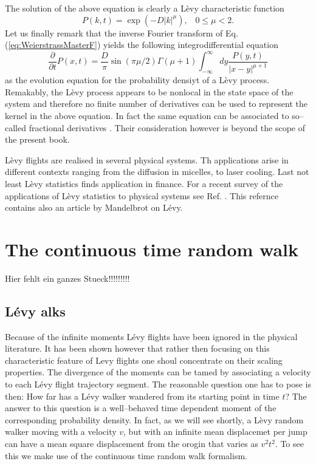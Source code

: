 The solution of the above equation is clearly a L\`evy characteristic function
\begin{displaymath}
  P(k,t) = \exp(-D |k|^{\mu}), \;\;\; 0 \le \mu <2.
\end{displaymath}
Let us finally remark that the inverse Fourier transform of Eq. 
(\ref{eq:WeierstrassMasterF}) yields the following integrodifferential
equation
\begin{displaymath}
 \frac{\partial}{\partial t} P(x,t) = \frac{D}{\pi} \sin(\pi \mu/2) 
         \Gamma(\mu +1) \int_{-\infty}^{\infty} dy
           \frac{P(y,t)}{|x-y|^{\mu +1}} 
\end{displaymath}
as the evolution equation for the probability densiyt of a L\`evy process.
Remakably, the L\`evy process appears to be nonlocal in the state space of the
system and therefore no finite number of derivatives can be used to represent
the kernel in the above equation. In fact the same equation can be associated
to so--called fractional derivatives \cite{Zaslavski}. Their consideration
however is beyond the scope of the present book.

L\`evy flights  are realised in several physical systems. Th applications
arise in different contexts ranging from the diffusion in micelles,
to laser cooling. Last not least L\`evy statistics finds application 
in finance.  For a recent survey of the applications of L\`evy statistics to
physical systems see Ref. \cite{MoreLevyBook}. This refernce contains also
an article by Mandelbrot on L\'evy.

\section{The continuous time random walk}
Hier fehlt ein ganzes Stueck!!!!!!!!!
\subsection{L\'evy alks}
Because of the  infinite moments L\'evy flights have been ignored in the
physical literature. It has been shown however that rather then focusing on
this characteristic feature of Levy flights one shoul concentrate on their
scaling properties. The divergence of the moments can be tamed by associating
a velocity to each L\'evy flight trajectory segment. The reasonable question
one has to pose is then: How far has a L\'evy walker wandered from its
starting point in time $t$?  The answer to this question is a well--behaved
time dependent moment of the corresponding probability density. In fact, as we
will see shortly, a L\`evy random walker moving with a velocity $v$, but with
an infinite  mean displacemet per jump can have a mean square displacement
from the orogin that varies as $v^2 t^2$. To see this we make use of the
continuous time random walk formalism.

